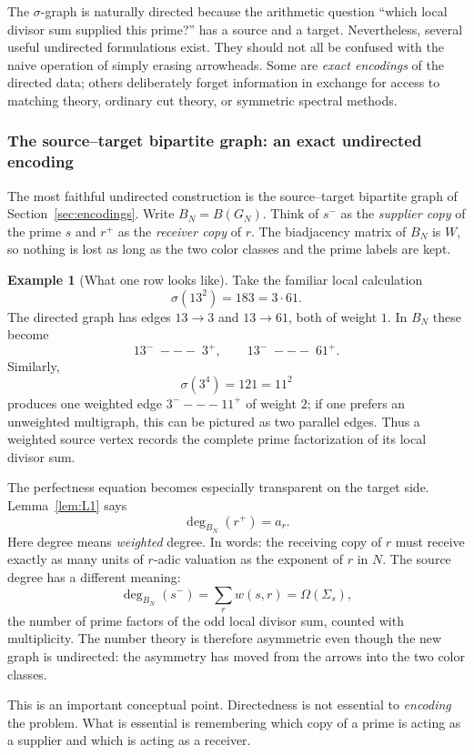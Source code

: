 \documentclass[11pt]{article}
\theoremstyle{definition}
\newtheorem{example}[theorem]{Example}
\theoremstyle{remark}
\begin{document}
The $\sigma$-graph is naturally directed because the arithmetic question
``which local divisor sum supplied this prime?'' has a source and a target.
Nevertheless, several useful undirected formulations exist.  They should not
all be confused with the naive operation of simply erasing arrowheads.  Some
are \emph{exact encodings} of the directed data; others deliberately forget
information in exchange for access to matching theory, ordinary cut theory,
or symmetric spectral methods.

\subsubsection{The source--target bipartite graph: an exact undirected encoding}

The most faithful undirected construction is the source--target bipartite
graph of Section~\ref{sec:encodings}.  Write $B_N=B(G_N)$.  Think of $s^-$
as the \emph{supplier copy} of the prime $s$ and $r^+$ as the
\emph{receiver copy} of $r$.  The biadjacency matrix of $B_N$ is $W$, so
nothing is lost as long as the two color classes and the prime labels are
kept.

\begin{example}[What one row looks like]
Take the familiar local calculation
\[
\sigma(13^2)=183=3\cdot61.
\]
The directed graph has edges $13\to3$ and $13\to61$, both of weight $1$.
In $B_N$ these become
\[
13^-\;---\;3^+,
\qquad
13^-\;---\;61^+.
\]
Similarly,
\[
\sigma(3^4)=121=11^2
\]
produces one weighted edge $3^-\!---\!11^+$ of weight $2$; if one prefers an
unweighted multigraph, this can be pictured as two parallel edges.  Thus a
weighted source vertex records the complete prime factorization of its local
divisor sum.
\end{example}

The perfectness equation becomes especially transparent on the target side.
Lemma~\ref{lem:L1} says
\[
\boxed{\deg_{B_N}(r^+)=a_r.}
\]
Here degree means \emph{weighted} degree.  In words: the receiving copy of
$r$ must receive exactly as many units of $r$-adic valuation as the exponent
of $r$ in $N$.  The source degree has a different meaning:
\[
\deg_{B_N}(s^-)=\sum_r w(s,r)=\Omega(\Sigma_s),
\]
the number of prime factors of the odd local divisor sum, counted with
multiplicity.  The number theory is therefore asymmetric even though the
new graph is undirected: the asymmetry has moved from the arrows into the two
color classes.

This is an important conceptual point.  Directedness is not essential to
\emph{encoding} the problem.  What is essential is remembering which copy of
a prime is acting as a supplier and which is acting as a receiver.
\end{document}
